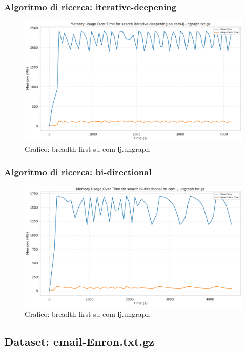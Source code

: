 \documentclass{article}
\begin{document}
\subsubsection{Algoritmo di ricerca: iterative-deepening}
\begin{figure}[h]\centering
\includegraphics[width=\textwidth]{../plots/com-lj.ungraph_iterative-deepening.png}
\caption{Grafico: breadth-first su com-lj.ungraph}
\end{figure}
\subsubsection{Algoritmo di ricerca: bi-directional}
\begin{figure}[h]\centering
\includegraphics[width=\textwidth]{../plots/com-lj.ungraph_bi-directional.png}
\caption{Grafico: breadth-first su com-lj.ungraph}
\end{figure}
\subsection{Dataset: email-Enron.txt.gz}
\end{document}
